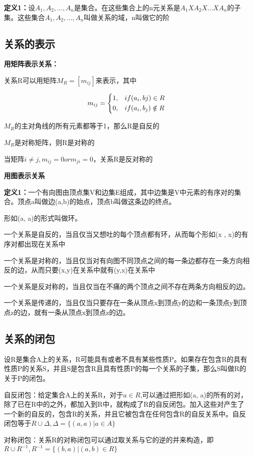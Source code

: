 \documentclass{ctexart}
\begin{document}
	\textbf{定义1：}设\(A_1,A_2,...,A_n\)是集合。在这些集合上的n元关系是\(A_1 X A_2 X...X A_n\)的子集。这些集合\(A_1,A_2,...,A_n\)叫做关系的域，n叫做它的阶
	
	\subsection{关系的表示}
	
	\textbf{用矩阵表示关系：}
	
	关系R可以用矩阵\(M_R = [m_{ij}]\)来表示，其中
	
	\[m_{ij} = 
	\begin{dcases}
	1,  & if (a_i, bj)\in R \\
	0, & if (a_i, b_j) \notin R
	\end{dcases}\]
	
	\(M_R\)的主对角线的所有元素都等于1，那么R是自反的
	
	\(M_R\)是对称矩阵，则R是对称的
	
	当矩阵\(i \neq j, m_{ij}=0 or m_{ji} = 0\)，关系R是反对称的
	
	\textbf{用图表示关系}
	
	\textbf{定义1：}一个有向图由顶点集V和边集E组成，其中边集是V中元素的有序对的集合。顶点a叫做边(a,b)的始点，顶点b叫做这条边的终点。
	
	形如(a, a)的形式叫做环。
	
	一个关系是自反的，当且仅当又想吐的每个顶点都有环，从而每个形如(x , x)的有序对都出现在关系中
	
	一个关系是对称的，当且仅当对有向图不同顶点之间的每一条边都存在一条方向相反的边，从而只要(x,y)在关系中就有(y,x)在关系中
	
	一个关系是反对称的，当且仅当在不痛的两个顶点之间不存在两条方向相反的边。
	
	一个关系是传递的，当且仅当只要存在一条从顶点x到顶点y的边和一条顶点y到顶点z的边，就有一条从顶点x到顶点z的边。
	
	\subsection{关系的闭包}
	
	设R是集合A上的关系，R可能具有或者不具有某些性质P。如果存在包含R的具有性质P的关系S，并且S是包含R且具有性质P的每一个关系的子集，那么S叫做R的关于P的闭包。
	
	自反闭包：给定集合A上的关系R，对于\(a \in R\),可以通过把形如(a, a)的所有的对，除了已在R中的之外，都加入到R中，就构成了R的自反闭包。加入这些对产生了一个新的自反的，包含R的关系，并且它被包含在任何包含R的自反关系中。自反闭包等于\(R \cup \Delta, \Delta = \{(a, a)|a\in A\}\)
	
	对称闭包：关系R的对称闭包可以通过取关系与它的逆的并来构造，即\(R \cup R^{-1}, R^{-1}=\{(b,a)|(a,b)\in R\}\)
	
	
	
	
	
	
	
	
	
	
	
	
	
	
	
	
	
	
	
	
	
	
	
	
\end{document}
